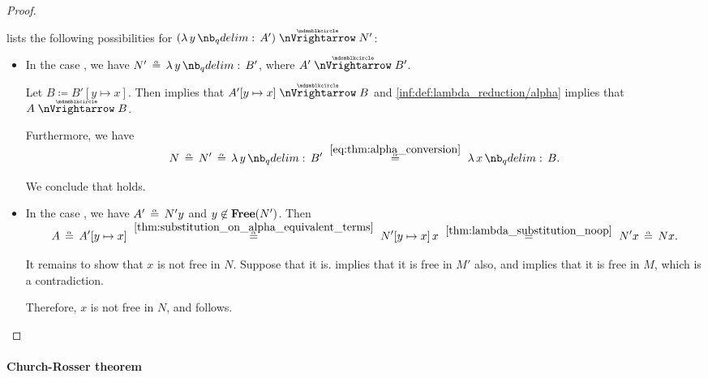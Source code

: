 \begin{proof}
\begin{itemize}
     lists the following possibilities for \( (\qabs y A') \ppred N' \):
    \begin{itemize}
      \item In the case , we have \( N' \aequiv \qabs y B' \), where \( A' \ppred B' \).

      Let \( B \coloneqq B'[y \mapsto x] \). Then  implies that \( A'[y \mapsto x] \ppred B \) and \ref{inf:def:lambda_reduction/alpha} implies that \( A \ppred B \).

      Furthermore, we have
      \begin{equation*}
        N
        \aequiv
        N'
        \aequiv
        \qabs y B'
        \reloset {\eqref{eq:thm:alpha_conversion}} \aequiv
        \qabs x B.
      \end{equation*}

      We conclude that  holds.

      \item In the case , we have \( A' \aequiv N'y \) and \( y \not\in \op*{Free}(N') \). Then
      \begin{equation*}
        A
        \aequiv
        A'[y \mapsto x]
        \reloset {\ref{thm:substitution_on_alpha_equivalent_terms}} \aequiv
        N'[y \mapsto x] \thinspace x
        \reloset {\ref{thm:lambda_substitution_noop}} =
        N' x
        \aequiv
        N x.
      \end{equation*}

      It remains to show that \( x \) is not free in \( N \). Suppose that it is.  implies that it is free in \( M' \) also, and  implies that it is free in \( M \), which is a contradiction.

      Therefore, \( x \) is not free in \( N \), and  follows.
    \end{itemize}
  \end{itemize}
\end{proof}

\paragraph{Church-Rosser theorem}

